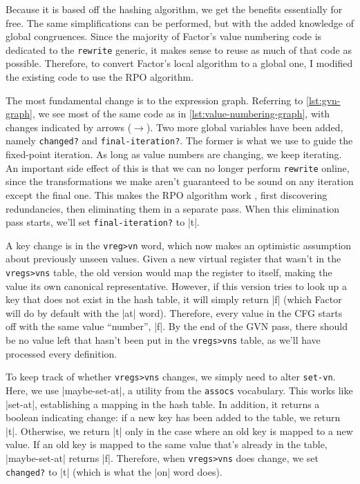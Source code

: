 Because it is based off the hashing algorithm, we get the benefits essentially
for free.  The same simplifications can be performed, but with the added
knowledge of global congruences.  Since the majority of Factor's value
numbering code is dedicated to the \Verb|rewrite| generic, it makes sense to
reuse as much of that code as possible.  Therefore, to convert Factor's local
algorithm to a global one, I modified the existing code to use the \gls{RPO}
algorithm.


The most fundamental change is to the expression graph.  Referring to
\vref{lst:gvn-graph}, we see most of the same code as in
\vref{lst:value-numbering-graph}, with changes indicated by arrows
($\longrightarrow$).  Two more global variables have been added, namely
\Verb|changed?| and \Verb|final-iteration?|.  The former is what we use to
guide the fixed-point iteration.  As long as value numbers are changing, we
keep iterating.  An important side effect of this is that we can no longer
perform \Verb|rewrite| online, since the transformations we make aren't
guaranteed to be sound on any iteration except the final one.  This makes the
\gls{RPO} algorithm work , first discovering redundancies, then
eliminating them in a separate pass.  When this elimination pass starts, we'll
set \Verb|final-iteration?| to \factor|t|.

A key change is in the \Verb|vreg>vn| word, which now makes an optimistic
assumption about previously unseen values.  Given a new virtual register that
wasn't in the \Verb|vregs>vns| table, the old version would map the register
to itself, making the value its own canonical representative.  However, if this
version tries to look up a key that does not exist in the hash table, it will
simply return \factor|f| (which Factor will do by default with the \factor|at|
word).  Therefore, every value in the \gls{CFG} starts off with the same value
``number'', \factor|f|.  By the end of the \gls{GVN} pass, there should be no
value left that hasn't been put in the \Verb|vregs>vns| table, as we'll have
processed every definition.

To keep track of whether \Verb|vregs>vns| changes, we simply need to alter
\Verb|set-vn|.  Here, we use \factor|maybe-set-at|, a utility from the
\Verb|assocs| vocabulary.  This works like \factor|set-at|, establishing a
mapping in the hash table.  In addition, it returns a boolean indicating
change: if a new key has been added to the table, we return \factor|t|.
Otherwise, we return \factor|t| only in the case where an old key is mapped to
a new value.  If an old key is mapped to the same value that's already in the
table, \factor|maybe-set-at| returns \factor|f|.  Therefore, when
\Verb|vregs>vns| does change, we set \Verb|changed?| to \factor|t| (which
is what the \factor|on| word does).

